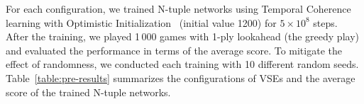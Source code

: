 
For each configuration, we trained N-tuple networks using Temporal Coherence learning with Optimistic Initialization~\cite{GuCW22} (initial value 1200) for $5\times 10^8$ steps.  After the training, we played 1\,000 games with 1-ply lookahead (the greedy play) and evaluated the performance in terms of the average score.  To mitigate the effect of randomness, we conducted each training with 10 different random seeds.
Table~\ref{table:pre-results} summarizes the configurations of VSEs and the average score of the trained N-tuple networks.

